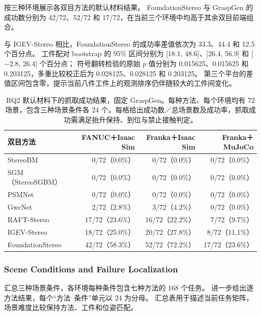 \documentclass[UTF8,fontset=fandol,a4paper,11pt]{ctexart}
\begin{document}
按三种环境展示各双目方法的默认材料结果。
FoundationStereo 与 GraspGen 的成功数分别为 42/72、52/72 和 17/72，在当前三个环境中均高于其余双目前端组合。

与 IGEV-Stereo 相比，FoundationStereo 的成功率差值依次为 33.3、44.4 和 12.5 个百分点。
工件配对 bootstrap 的 95\% 区间分别为 [18.1, 48.6]、[26.4, 56.9] 和 [$-2.8$, 26.4] 个百分点；
符号翻转检验的原始 $p$ 值分别为 0.015625、0.015625 和 0.203125，多重比较校正后为 0.028125、0.028125 和 0.203125。
第三个平台的差值区间包含零，提示当前八件工件上的观测排序仍伴随较大的工件间变化。

\begin{table}[H]
\centering\small
\caption{RQ2 默认材料下的抓取成功结果，固定 GraspGen。每种方法、每个环境均有 72 场景，包含三种场景条件各 24 个。每格给出成功数／总场景数及成功率，抓取成功需满足抬升保持、到位与禁止接触判定。}
\label{tab:rq2}
\begin{tabularx}{\linewidth}{Y r r r}
\toprule
双目方法 & FANUC＋Isaac Sim & Franka＋Isaac Sim & Franka＋MuJoCo \\
\midrule
StereoBM & 0/72（0.0\%） & 0/72（0.0\%） & 0/72（0.0\%） \\
SGM（StereoSGBM） & 0/72（0.0\%） & 0/72（0.0\%） & 0/72（0.0\%） \\
PSMNet & 0/72（0.0\%） & 0/72（0.0\%） & 0/72（0.0\%） \\
GwcNet & 2/72（2.8\%） & 3/72（4.2\%） & 0/72（0.0\%） \\
RAFT-Stereo & 17/72（23.6\%） & 16/72（22.2\%） & 7/72（9.7\%） \\
IGEV-Stereo & 18/72（25.0\%） & 20/72（27.8\%） & 8/72（11.1\%） \\
FoundationStereo & 42/72（58.3\%） & 52/72（72.2\%） & 17/72（23.6\%） \\
\bottomrule
\end{tabularx}
\end{table}

\subsubsection{Scene Conditions and Failure Localization}

汇总三种场景条件，各环境每种条件包含七种方法的 168 个任务。
进一步给出逐方法结果，每个“方法--条件”单元以 24 为分母。
汇总表用于描述当前任务矩阵，场景难度比较保持方法、工件和位姿匹配。
\end{document}
